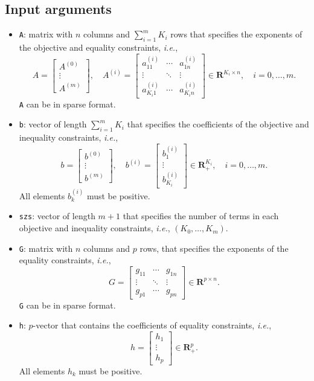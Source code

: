 \documentclass[12pt]{article}
\newcommand{\ie}{{\it i.e.}}
\newcommand{\reals}{{\mathbf R}}
\begin{document}
\subsection{Input arguments}

\begin{itemize}
\item{\tt A}: matrix with $n$ columns and $\sum_{i=1}^{m} K_i$ rows 
that specifies the exponents of the objective and equality constraints, \ie,
\[
A = \left[\begin{array}{c} A^{(0)} \\ \vdots \\ A^{(m)} \end{array}\right],
\quad
A^{(i)}=
\left[\begin{array}{ccc}
    a_{1 1}^{(i)}   & \cdots & a_{1 n}^{(i)}  \\
    \vdots          & \ddots & \vdots         \\
    a_{K_i 1}^{(i)} & \cdots & a_{K_i n}^{(i)}
\end{array}\right]
\in \reals^{K_i \times n}, \quad i = 0,\ldots,m.
\]
{\tt A} can be in sparse format.

\item{\tt b}: vector of length $\sum_{i=1}^{m} K_i$ that specifies
the coefficients of the objective and inequality constraints, \ie,
\[
b = 
\left[\begin{array}{c} {b^{(0)}} \\ \vdots \\ {b^{(m)}} \end{array} \right],
\quad
b^{(i)}=
\left[\begin{array}{c}
    b_{1}^{(i)} \\ \vdots \\ b_{K_i}^{(i)}
\end{array}\right]
\in \reals_+^{K_i}, \quad i = 0,\ldots,m.
\]
All elements $b_k^{(i)}$ must be positive.

\item{\tt szs}: vector of length $m+1$ that specifies the number of terms
in each objective and inequality constraints, \ie, $(K_0, \ldots, K_m)$.

\item{\tt G}: matrix with $n$ columns and $p$ rows, that specifies
the exponents of the equality constraints, \ie,
\[
G = 
\left[\begin{array}{ccc}
    g_{1 1} & \cdots & g_{1 n} \\
    \vdots  & \ddots & \vdots  \\
    g_{p 1} & \cdots & g_{p n}
\end{array}\right]
\in \reals^{p \times n}.
\]
{\tt G} can be in sparse format.
\item{\tt h}: $p$-vector that contains the coefficients of equality 
constraints, \ie,
\[
h = 
\left[\begin{array}{c} h_{1} \\ \vdots \\ h_{p} \end{array}\right]
\in \reals_+^{p}.
\]
All elements $h_k$ must be positive.


\end{itemize}
\end{document}
